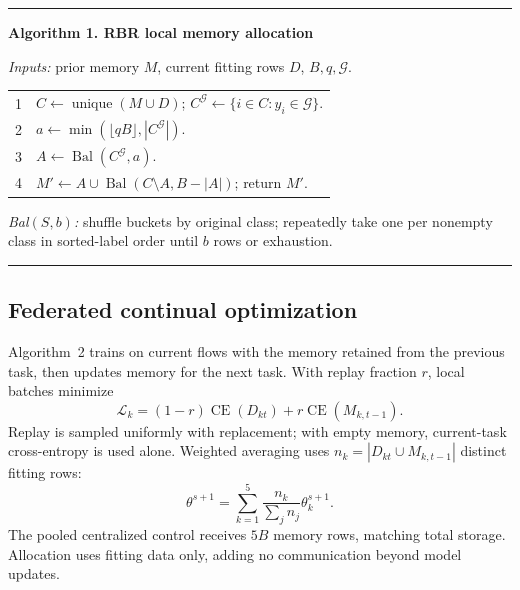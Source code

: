 \documentclass[journal,10pt]{IEEEtran}
\begin{document}
\noindent\begin{minipage}{\columnwidth}
\smallskip\hrule\smallskip
\footnotesize\textbf{Algorithm 1. RBR local memory allocation}\par
\textit{Inputs:} prior memory $M$, current fitting rows $D$, $B,q,\mathcal G$.
\begin{tabular}{@{}r@{\quad}p{}@{}}
1 & $C\leftarrow\operatorname{unique}(M\cup D)$; $C^{\mathcal G}\leftarrow\{i\in C:y_i\in\mathcal G\}$.\\
2 & $a\leftarrow\min(\lfloor qB\rfloor,|C^{\mathcal G}|)$.\\
3 & $A\leftarrow\operatorname{Bal}(C^{\mathcal G},a)$.\\
4 & $M'\leftarrow A\cup\operatorname{Bal}(C\setminus A,B-|A|)$; return $M'$.\\
\end{tabular}
\textit{Bal$(S,b)$:} shuffle buckets by original class; repeatedly take one per nonempty class in sorted-label order until $b$ rows or exhaustion.
\smallskip\hrule\smallskip
\end{minipage}

\subsection{Federated continual optimization}
Algorithm~2 trains on current flows with the memory retained from the previous task, then updates memory for the next task. With replay fraction $r$, local batches minimize
\begin{equation}
\mathcal L_k=(1-r)\operatorname{CE}(D_{kt})+r\operatorname{CE}(M_{k,t-1}).
\label{eq:loss}
\end{equation}
Replay is sampled uniformly with replacement; with empty memory, current-task cross-entropy is used alone. Weighted averaging uses $n_k=|D_{kt}\cup M_{k,t-1}|$ distinct fitting rows:
\begin{equation}
\theta^{s+1}=\sum_{k=1}^{5}\frac{n_k}{\sum_j n_j}\theta_k^{s+1}.
\label{eq:fedavg}
\end{equation}
The pooled centralized control receives $5B$ memory rows, matching total storage. Allocation uses fitting data only, adding no communication beyond model updates.
\end{document}
